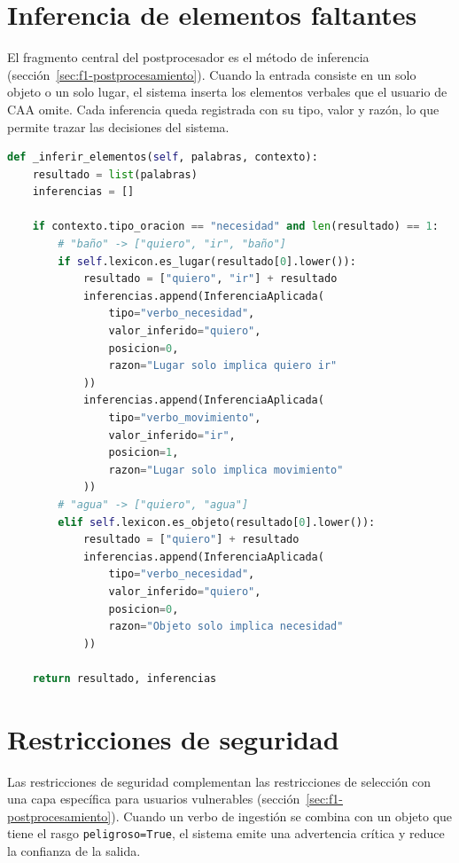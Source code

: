 \section{Inferencia de elementos faltantes}

El fragmento central del postprocesador es el método de inferencia (sección~\ref{sec:f1-postprocesamiento}). Cuando la entrada consiste en un solo objeto o un solo lugar, el sistema inserta los elementos verbales que el usuario de CAA omite. Cada inferencia queda registrada con su tipo, valor y razón, lo que permite trazar las decisiones del sistema.

\begin{lstlisting}[language=Python,caption={Inferencia de elementos faltantes (\texttt{postprocessor.py}).},label={lst:inferencia},basicstyle=\ttfamily\small,xleftmargin=1cm]
def _inferir_elementos(self, palabras, contexto):
    resultado = list(palabras)
    inferencias = []

    if contexto.tipo_oracion == "necesidad" and len(resultado) == 1:
        # "baño" -> ["quiero", "ir", "baño"]
        if self.lexicon.es_lugar(resultado[0].lower()):
            resultado = ["quiero", "ir"] + resultado
            inferencias.append(InferenciaAplicada(
                tipo="verbo_necesidad",
                valor_inferido="quiero",
                posicion=0,
                razon="Lugar solo implica quiero ir"
            ))
            inferencias.append(InferenciaAplicada(
                tipo="verbo_movimiento",
                valor_inferido="ir",
                posicion=1,
                razon="Lugar solo implica movimiento"
            ))
        # "agua" -> ["quiero", "agua"]
        elif self.lexicon.es_objeto(resultado[0].lower()):
            resultado = ["quiero"] + resultado
            inferencias.append(InferenciaAplicada(
                tipo="verbo_necesidad",
                valor_inferido="quiero",
                posicion=0,
                razon="Objeto solo implica necesidad"
            ))

    return resultado, inferencias
\end{lstlisting}

\section{Restricciones de seguridad}

Las restricciones de seguridad complementan las restricciones de selección con una capa específica para usuarios vulnerables (sección~\ref{sec:f1-postprocesamiento}). Cuando un verbo de ingestión se combina con un objeto que tiene el rasgo \texttt{peligroso=True}, el sistema emite una advertencia crítica y reduce la confianza de la salida.

